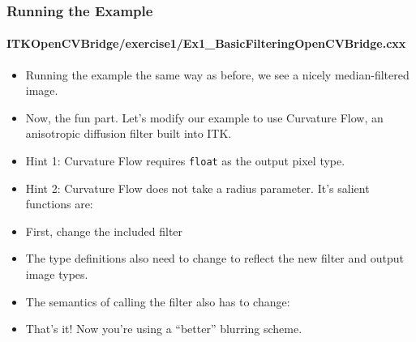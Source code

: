 \begin{frame}
\frametitle{Running the Example}
\framesubtitle{ITKOpenCVBridge/exercise1/Ex1\_BasicFilteringOpenCVBridge.cxx}
\begin{itemize}
\item Running the example the same way as before, we see a nicely
median-filtered image.
\pause
\item Now, the fun part. Let's modify our example to use Curvature Flow, an
anisotropic diffusion filter built into ITK.
\end{itemize}
\end{frame}

\begin{frame}
\begin{itemize}
\frametitle{Exercise 1}
\framesubtitle{ITKOpenCVBridge/exercise1/Ex1\_BasicFilteringOpenCVBridge.cxx}
\item Hint 1: Curvature Flow requires {\tt float} as the output pixel
  type.
\pause
\item Hint 2: Curvature Flow does not take a radius parameter. It's
  salient functions are:
\end{itemize}
\end{frame}

\begin{frame}
\begin{itemize}
\frametitle{Exercise 1: Answer}
\framesubtitle{ITKOpenCVBridge/exercise1/Ex1\_BasicFilteringOpenCVBridgeAnswer.cxx}
\item First, change the included filter
\pause
\item The type definitions also need to change to reflect the new
  filter and output image types.
\end{itemize}
\end{frame}

\begin{frame}
\begin{itemize}
\frametitle{Exercise 1: Answer}
\framesubtitle{ITKOpenCVBridge/exercise1/Ex1\_BasicFilteringOpenCVBridgeAnswer.cxx}
\item The semantics of calling the filter also has to change:
\pause
\item That's it! Now you're using a ``better'' blurring scheme.
\end{itemize}
\end{frame}

